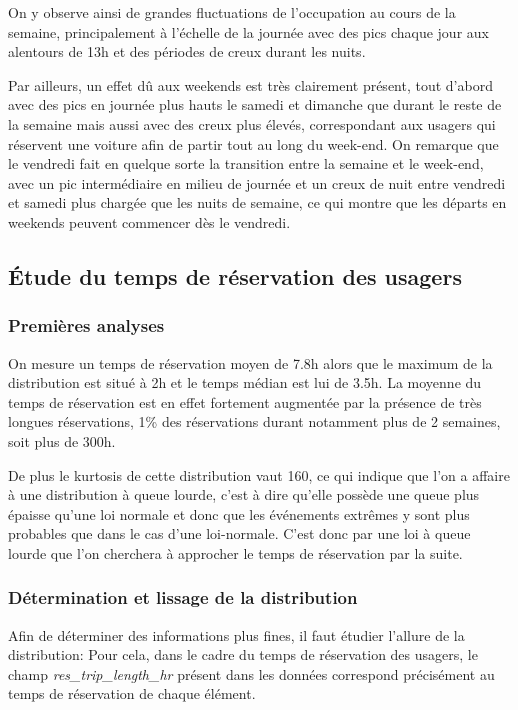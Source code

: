 \documentclass[12pt,a4paper]{article}
\newcommand{\1}[1]{\mathbbm{1}_{\{#1\}} }
\theoremstyle{definition}
\begin{document}
{On y observe ainsi de grandes fluctuations de l'occupation au cours de la semaine, principalement à l'échelle de la journée avec des pics chaque jour aux alentours de 13h et des périodes de creux durant les nuits. 

Par ailleurs, un effet dû aux weekends est très clairement présent, tout d'abord avec des pics en journée plus hauts le samedi et dimanche que durant le reste de la semaine mais aussi avec des creux plus élevés, correspondant aux usagers qui réservent une voiture afin de partir tout au long du week-end. On remarque que le vendredi fait en quelque sorte la transition entre la semaine et le week-end, avec un pic intermédiaire en milieu de journée et un creux de nuit entre vendredi et samedi plus chargée que les nuits de semaine, ce qui montre que les départs en weekends peuvent commencer dès le vendredi.






\subsection{Étude du temps de réservation des usagers}


\subsubsection{Premières analyses}

On mesure un temps de réservation moyen de 7.8h alors que le maximum de la distribution est situé à 2h et le temps médian est lui de 3.5h. La moyenne du temps de réservation est en effet fortement augmentée par la présence de très longues réservations, 1\% des réservations durant notamment plus de 2 semaines, soit plus de 300h.

De plus le kurtosis de cette distribution vaut 160, ce qui indique que l'on a affaire à une distribution à queue lourde, c'est à dire qu'elle possède une queue plus épaisse qu'une loi normale et donc que les événements extrêmes y sont plus probables que dans le cas d'une loi-normale. C'est donc par une loi à queue lourde que l'on cherchera à approcher le temps de réservation par la suite.



\subsubsection{Détermination et lissage de la distribution}

Afin de déterminer des informations plus fines, il faut étudier l'allure de la distribution:
Pour cela, dans le cadre du temps de réservation des usagers, le champ \emph{res\_trip\_length\_hr} présent dans les données correspond précisément au temps de réservation de chaque élément.

}
\end{document}
